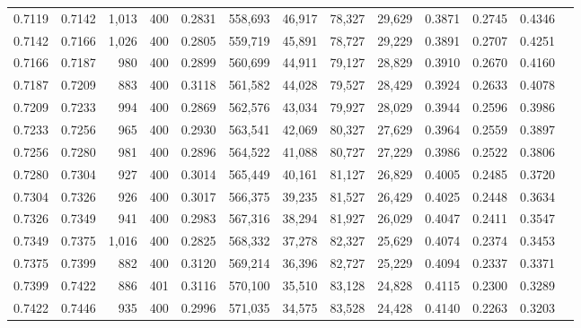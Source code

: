 \begin{tabular}{rrrrrrrrrrrrr}
0.7119 & 0.7142 &  1,013 & 400 &                                     0.2831 & 558,693 &  46,917 &  78,327 &  29,629 & 0.3871 & 0.2745 & 0.4346 \\
0.7142 & 0.7166 &  1,026 & 400 &                                     0.2805 & 559,719 &  45,891 &  78,727 &  29,229 & 0.3891 & 0.2707 & 0.4251 \\
0.7166 & 0.7187 &    980 & 400 &                                     0.2899 & 560,699 &  44,911 &  79,127 &  28,829 & 0.3910 & 0.2670 & 0.4160 \\
0.7187 & 0.7209 &    883 & 400 &                                     0.3118 & 561,582 &  44,028 &  79,527 &  28,429 & 0.3924 & 0.2633 & 0.4078 \\
0.7209 & 0.7233 &    994 & 400 &                                     0.2869 & 562,576 &  43,034 &  79,927 &  28,029 & 0.3944 & 0.2596 & 0.3986 \\
0.7233 & 0.7256 &    965 & 400 &                                     0.2930 & 563,541 &  42,069 &  80,327 &  27,629 & 0.3964 & 0.2559 & 0.3897 \\
0.7256 & 0.7280 &    981 & 400 &                                     0.2896 & 564,522 &  41,088 &  80,727 &  27,229 & 0.3986 & 0.2522 & 0.3806 \\
0.7280 & 0.7304 &    927 & 400 &                                     0.3014 & 565,449 &  40,161 &  81,127 &  26,829 & 0.4005 & 0.2485 & 0.3720 \\
0.7304 & 0.7326 &    926 & 400 &                                     0.3017 & 566,375 &  39,235 &  81,527 &  26,429 & 0.4025 & 0.2448 & 0.3634 \\
0.7326 & 0.7349 &    941 & 400 &                                     0.2983 & 567,316 &  38,294 &  81,927 &  26,029 & 0.4047 & 0.2411 & 0.3547 \\
0.7349 & 0.7375 &  1,016 & 400 &                                     0.2825 & 568,332 &  37,278 &  82,327 &  25,629 & 0.4074 & 0.2374 & 0.3453 \\
0.7375 & 0.7399 &    882 & 400 &                                     0.3120 & 569,214 &  36,396 &  82,727 &  25,229 & 0.4094 & 0.2337 & 0.3371 \\
0.7399 & 0.7422 &    886 & 401 &                                     0.3116 & 570,100 &  35,510 &  83,128 &  24,828 & 0.4115 & 0.2300 & 0.3289 \\
0.7422 & 0.7446 &    935 & 400 &                                     0.2996 & 571,035 &  34,575 &  83,528 &  24,428 & 0.4140 & 0.2263 & 0.3203 \\

\end{tabular}
